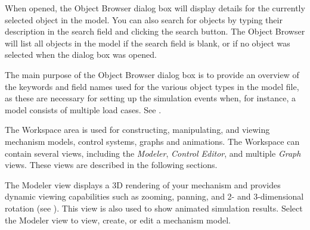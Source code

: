 
When opened, the Object Browser dialog box
will display details for the currently selected object in the model. You can
also search for objects by typing their description in the search field and
clicking the search button. The Object Browser will list all objects in the
model if the search field is blank, or if no object was selected when the
dialog box was opened.


The main purpose of the Object Browser dialog box is to provide an
overview of the keywords and field names used for the various object types
in the model file, as these are necessary for setting up the simulation events
when, for instance, a model consists of multiple load cases.
See .



The Workspace area is used for constructing, manipulating,
and viewing mechanism models, control systems, graphs and animations.
The Workspace can contain several views, including the {\sl Modeler},
{\sl Control Editor}, and multiple {\sl Graph} views.
These views are described in the following sections.



The Modeler view displays a 3D rendering of your mechanism and provides
dynamic viewing capabilities such as zooming, panning, and 2- and 3-dimensional
rotation (see ).
This view is also used to show animated simulation results.
Select the Modeler view to view, create, or edit a mechanism model.



